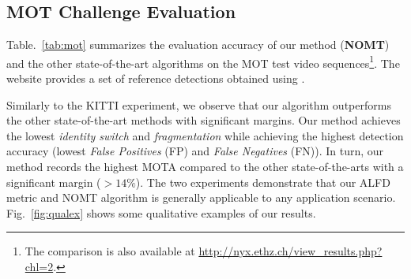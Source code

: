 \documentclass[10pt,twocolumn,letterpaper]{article}
\begin{document}
\subsection{MOT Challenge Evaluation}

Table.~\ref{tab:mot} summarizes the evaluation accuracy of our method ({\bf NOMT}) and the other state-of-the-art algorithms on the MOT test video sequences\footnote{The comparison is also available at \url{http://nyx.ethz.ch/view_results.php?chl=2}.}. The website provides a set of reference detections obtained using \cite{DollarPAMI14pyramids}.

Similarly to the KITTI experiment, we observe that our algorithm outperforms the other state-of-the-art methods with significant margins. Our method achieves the lowest \emph{identity switch} and \emph{fragmentation} while achieving the highest detection accuracy (lowest \emph{False Positives} (FP) and \emph{False Negatives} (FN)). In turn, our method records the highest MOTA compared to the other state-of-the-arts with a significant margin ($> 14 \%$). The two experiments demonstrate that our ALFD metric and NOMT algorithm is generally applicable to any application scenario. Fig.~\ref{fig:qualex} shows some qualitative examples of our results.
\end{document}
